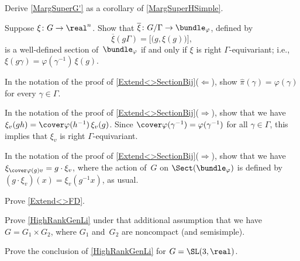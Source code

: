 \begin{exercises}

\item \label{MargSuperHSimpleEx}
Derive \cref{MargSuperG'} as a corollary of \cref{MargSuperHSimple}.

\item \label{Equi<>SectionEx}
Suppose $\xi \colon G \to \real^n$. Show that $\overline\xi \colon G/\Gamma \to \bundle_\varphi$, defined by
	$$ \overline\xi(g \Gamma) = \bigl[ \bigl( g,{\xi}(g) \bigr) \bigr] , $$
is a well-defined section of~$\bundle_\varphi$ if and only if $\xi$ is right $\Gamma$-equivariant; i.e., $\xi(g \gamma) = \varphi(\gamma^{-1}) \,\xi(g)$.

\item \label{PiHatExtendsPhi}
In the notation of the proof of \cref{Extend<>SectionBij}($\Leftarrow$), show $\widehat\pi(\gamma) = \varphi(\gamma)$ for every $\gamma \in \Gamma$.

\item \label{XivEqui}
In the notation of the proof of \cref{Extend<>SectionBij}($\Rightarrow$), show that we have $\xi_v(gh) = \cover\varphi(h^{-1}) \, \xi_v(g)$. Since $\cover\varphi(\gamma^{-1}) = \varphi(\gamma^{-1})$ for all $\gamma \in \Gamma$, this implies that $\xi_v$ is right $\Gamma$-equivariant.

\item \label{XiGEqui}
In the notation of the proof of \cref{Extend<>SectionBij}($\Rightarrow$), show that we have
$\xi_{\cover\varphi(g) v} = g \cdot \xi_v$, where the action of~$G$ on $\Sect(\bundle_\varphi)$ is defined by $(g \cdot \xi_v)(x) = \xi_v(g^{-1} x)$, as usual.

\item \label{Extend<>FDEx}
Prove \cref{Extend<>FD}.

\item \label{G1xG2GenLiEx}
Prove \cref{HighRankGenLi} under that additional assumption that we have $G = G_1 \times G_2$, where $G_1$ and~$G_2$ are noncompact (and semisimple).

\item \label{SL3RGenLiEx}
Prove the conclusion of \cref{HighRankGenLi} for $G = \SL(3,\real)$.


\end{exercises}
